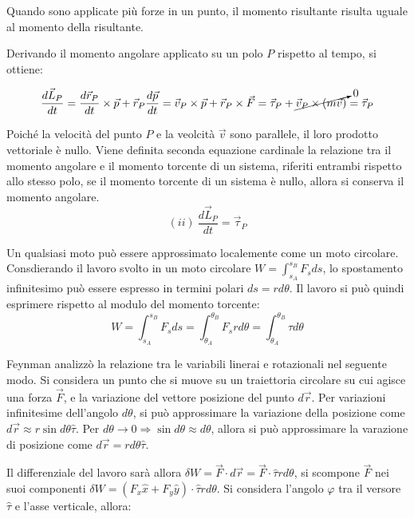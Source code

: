 \documentclass{article}
\numberwithin{equation}{subsection}
\begin{document}
Quando sono applicate più forze in un punto, il momento risultante risulta uguale al momento della risultante. 

Derivando il momento angolare applicato su un polo $P$ rispetto al tempo, si ottiene: 


\begin{equation}
    \displaystyle\frac{d\vec{L}_P}{dt}=\frac{d\vec{r}_P}{dt}\times\vec{p}+\vec{r}_P\frac{d\vec{p}}{dt}=\vec{v}_P\times\vec{p}+\vec{r}_P\times\vec{F}=\vec{\tau}_P+\cancelto{0}{\vec{v}_P\times(m\vec{v})}=\vec{\tau}_P
\end{equation}


Poiché la velocità del punto $P$ e la veolcità 
$\vec{v}$ sono parallele, il loro prodotto vettoriale è nullo.
Viene 
definita seconda equazione cardinale la relazione tra il momento angolare e il momento torcente di un sistema, riferiti entrambi rispetto allo stesso polo, se il momento torcente di un sistema è nullo, allora si conserva 
il momento angolare.
\begin{equation*}
    (ii)\:\displaystyle\frac{d\vec{L}_P}{dt}=\vec{\tau}_P
\end{equation*}


Un qualsiasi moto può essere approssimato localemente come un moto circolare. Consdierando il lavoro svolto in un moto circolare $W=\displaystyle\int_{s_A}^{s_B}{F}_s ds$, lo spostamento infinitesimo può essere espresso 
in termini polari $ds=rd\theta$. Il lavoro si può quindi esprimere rispetto al modulo del momento torcente: 
\begin{equation*}
    W=\displaystyle\int_{s_A}^{s_B}{F}_s ds=\int_{\theta_A}^{\theta_B}F_srd\theta=\int_{\theta_A}^{\theta_B}\tau d\theta
\end{equation*}




Feynman analizzò la relazione tra le variabili linerai e 
rotazionali nel seguente modo. Si considera un punto che si 
muove su un traiettoria circolare su cui agisce una forza $\vec{F}$, 
e la variazione del vettore posizione del punto $d\vec{r}$. Per 
variazioni infinitesime dell'angolo $d\theta$, si può approssimare la variazione 
della posizione come $d\vec{r}\approx r\sin d\theta\hat{\tau}$. Per 
$d\theta\to 0\Rightarrow \sin d\theta\approx d\theta$, allora si può 
approssimare la varazione di posizione come $d\vec{r}=rd\theta\hat{\tau}$. 


Il differenziale del lavoro sarà allora $\delta W =\vec{F}\cdot d\vec{r}=\vec{F}\cdot\hat{\tau}rd\theta$, 
si scompone $\vec{F}$ nei suoi componenti $\delta W=(F_x\hat{x}+F_y\hat{y})\cdot\hat{\tau}rd\theta$. 
Si considera l'angolo $\varphi$ tra il versore $\hat{\tau}$ e l'asse 
verticale, allora: 
\end{document}

